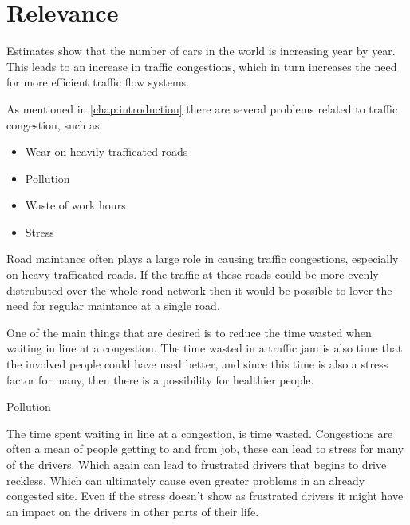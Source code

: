 \section{Relevance}
Estimates show that the number of cars in the world is increasing year by year. This leads to an increase in traffic congestions, which in turn increases the need for more efficient traffic flow systems.

As mentioned in \ref{chap:introduction} there are several problems related to traffic congestion, such as:
\begin{itemize}
	\item Wear on heavily trafficated roads
	\item Pollution
	\item Waste of work hours
	\item Stress
\end{itemize}

Road maintance often plays a large role in causing traffic congestions, especially on heavy trafficated roads. If the traffic at these roads could be more evenly distrubuted over the whole road network then it would be possible to lover the need for regular maintance at a single road.

One of the main things that are desired is to reduce the time wasted when waiting in line at a congestion.
The time wasted in a traffic jam is also time that the involved people could have used better, and since this time is also a stress factor for many, then there is a possibility for healthier people.

Pollution

The time spent waiting in line at a congestion, is time wasted. Congestions are often a mean of people getting to and from job, these can lead to stress for many of the drivers. Which again can lead to frustrated drivers that begins to drive reckless. Which can ultimately cause even greater problems in an already congested site. Even if the stress doesn't show as frustrated drivers it might have an impact on the drivers in other parts of their life.

